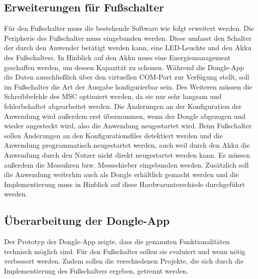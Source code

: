 \subsection{Erweiterungen für Fußschalter}
Für den Fußschalter muss die bestehende Software wie folgt erweitert werden. Die Peripherie des Fußschalter muss eingebunden werden. Diese umfasst den Schalter der durch den Anwender betätigt werden kann, eine LED-Leuchte und den Akku des Fußschalters. In Hinblick auf den Akku muss eine Energiemanagement geschaffen werden, um dessen Kapazität zu schonen. Während die Dongle-App die Daten ausschließlich über den virtuellen COM-Port zur Verfügung stellt, soll im Fußschalter die Art der Ausgabe konfigurierbar sein. Des Weiteren müssen die Schreibbefehle des \ac{MSC} optimiert werden, da sie nur sehr langsam und fehlerbehaftet abgearbeitet werden. Die Änderungen an der Konfiguration der Anwendung wird außerdem erst übernommen, wenn der Dongle abgezogen und wieder angesteckt wird, also die Anwendung neugestartet wird. Beim Fußschalter sollen Änderungen an den Konfigurationsfiles detektiert werden und die Anwendung programmatisch neugestartet werden, auch weil durch den Akku die Anwendung durch den Nutzer nicht direkt neugestartet werden kann. Es müssen außerdem die Messuhren bzw. Messschieber eingebunden werden. Zusätzlich soll die Anwendung weiterhin auch als Dongle erhältlich gemacht werden und die Implementierung muss in Hinblick auf diese Hardwarunterschiede durchgeführt werden.

\subsection{Überarbeitung der Dongle-App}
Der Prototyp der Dongle-App zeigte, dass die genannten Funktionalitäten technisch möglich sind. Für den Fußschalter sollen sie evaluiert und wenn nötig verbessert werden. Zudem sollen die verschiedenen Projekte, die sich durch die Implementierung des Fußschalters ergeben, getrennt werden.


